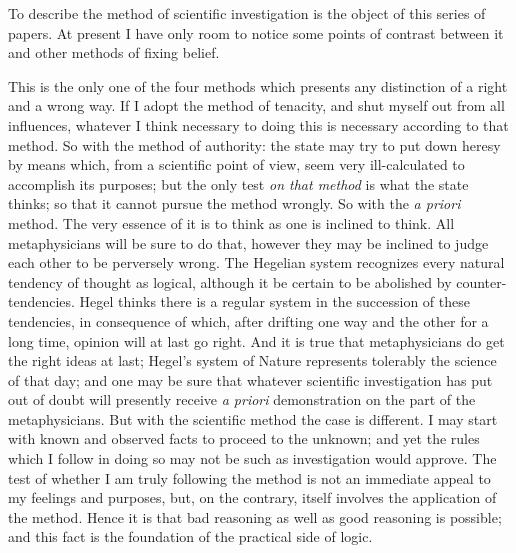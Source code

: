 To describe the method of scientific investigation is the object of this series of papers. At present I have only room to notice some points of contrast between it and other methods of fixing belief.

This is the only one of the four methods which presents any distinction of a right and a wrong way. If I adopt the method of tenacity, and shut myself out from all influences, whatever I think necessary to doing this is necessary according to that method. So with the method of authority: the state may try to put down heresy by means which, from a scientific point of view, seem very ill-calculated to accomplish its purposes; but the only test \emph{on that method} is what the state thinks; so that it cannot pursue the method wrongly. So with the \emph{a priori} method. The very essence of it is to think as one is inclined to think. All metaphysicians will be sure to do that, however they may be inclined to judge each other to be perversely wrong. The Hegelian system recognizes every natural tendency of thought as logical, although it be certain to be abolished by counter-tendencies. Hegel thinks there is a regular system in the succession of these tendencies, in consequence of which, after drifting one way and the other for a long time, opinion will at last go right. And it is true that metaphysicians do get the right ideas at last; Hegel's system of Nature represents tolerably the science of that day; and one may be sure that whatever scientific investigation has put out of doubt will presently receive \emph{a priori} demonstration on the part of the metaphysicians. But with the scientific method the case is different. I may start with known and observed facts to proceed to the unknown; and yet the rules which I follow in doing so may not be such as investigation would approve. The test of whether I am truly following the method is not an immediate appeal to my feelings and purposes, but, on the contrary, itself involves the application of the method. Hence it is that bad reasoning as well as good reasoning is possible; and this fact is the foundation of the practical side of logic.

